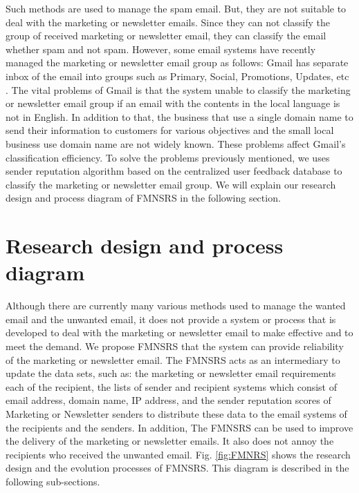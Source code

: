 \documentclass[conference]{IEEEtran}
\begin{document}
Such methods are used to manage the spam email.
%
But, they are not suitable to deal with the marketing or newsletter emails. 
%
Since they can not classify the group of received marketing or newsletter email, they can classify the email whether spam and not spam.
%
However, some email systems have recently managed the marketing or newsletter email group as follows: Gmail has separate inbox of the email into groups such as Primary, Social, Promotions, Updates, etc \cite{gmail}.
%
The vital problems of Gmail is that the system unable to classify the marketing or newsletter email group if an email with the contents in the local language is not in English.
%
In addition to that, the business that use a single domain name to send their information to customers for various objectives and the small local business use domain name are not widely known.
%
These problems affect Gmail's classification efficiency.
%
To solve the problems previously mentioned, we uses sender reputation algorithm based on the centralized user feedback database to classify the marketing or newsletter email group.
%
We will explain our research design and process diagram of FMNSRS in the following section.


\section{Research design and process diagram}

Although there are currently many various methods used to manage the wanted email and the unwanted email, it does not provide a system or process that is developed to deal with the marketing or newsletter email to make effective and to meet the demand.
%
We propose FMNSRS that the system can provide reliability of the marketing or newsletter email.
%
The FMNSRS acts as an intermediary to update the data sets, such as: the marketing or newsletter email requirements each of the recipient, 
the lists of sender and recipient systems which consist of email address, domain name, IP address, and the sender reputation scores of Marketing or Newsletter senders 
to distribute these data to the email systems of the recipients and the senders.
%
In addition, The FMNSRS can be used to improve the delivery of the marketing or newsletter emails. 
%
It also does not annoy the recipients who received the unwanted email.
%
Fig. \ref{fig:FMNRS} shows the research design and the evolution processes of FMNSRS. 
%
This diagram is described in the following sub-sections.
\end{document}
